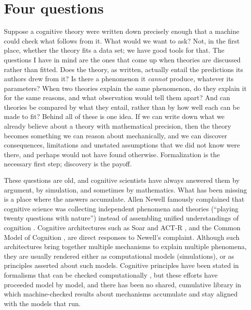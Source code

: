 \documentclass[11pt]{article}
\begin{document}
\section{Four questions}
\label{sec:intro}

Suppose a cognitive theory were written down precisely enough that a
machine could check what follows from it. What would we want to ask?
Not, in the first place, whether the theory fits a data set; we have
good tools for that. The questions I have in mind are the ones that
come up when theories are discussed rather than fitted. Does the
theory, as written, actually entail the predictions its authors drew
from it? Is there a phenomenon it \emph{cannot} produce, whatever its
parameters? When two theories explain the same phenomenon, do they
explain it for the same reasons, and what observation would tell them
apart? And can theories be compared by what they entail, rather than
by how well each can be made to fit? Behind all of these is one idea.
If we can write down what we already believe about a theory with
mathematical precision, then the theory becomes something we can
reason about mechanically, and we can discover consequences,
limitations and unstated assumptions that we did not know were there,
and perhaps would not have found otherwise. Formalization is the
necessary first step; discovery is the payoff.

These questions are old, and cognitive scientists have always answered
them by argument, by simulation, and sometimes by mathematics. What
has been missing is a place where the answers accumulate. Allen Newell
famously complained that cognitive science was collecting
independent phenomena and theories (``playing twenty questions with
nature'') instead of assembling unified understandings of cognition
\citep{newell1973}. Cognitive architectures such as Soar
\citep{laird1987,laird2012} and ACT-R \citep{anderson2007}, and the
Common Model of Cognition \citep{laird2017}, are direct responses to
Newell's complaint. Although such architectures bring together
multiple mechanisms to explain multiple phenomena, they are usually
rendered either as computational models (simulations), or as
principles asserted about such models. Cognitive principles have been
stated in formalisms that can be checked computationally
\citep{milnes1992,cooper1996,stewart2007,gall2018,langenfeld2019}, but
these efforts have proceeded model by model, and there has been no
shared, cumulative library in which machine-checked results about
mechanisms accumulate and stay aligned with the models that run.
\end{document}
